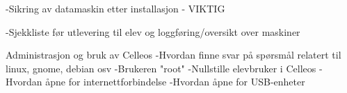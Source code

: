 -Sikring av datamaskin etter installasjon - VIKTIG

-Sjekkliste før utlevering til elev og loggføring/oversikt over maskiner

Administrasjon og bruk av Celleos
-Hvordan finne svar på spørsmål relatert til linux, gnome, debian osv
-Brukeren "root"
-Nullstille elevbruker i Celleos
-Hvordan åpne for internettforbindelse
-Hvordan åpne for USB-enheter

